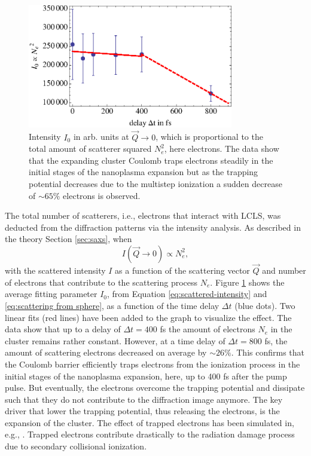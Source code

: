 \begin{figure}
	\centering
		\includegraphics[width=0.80\textwidth]{images/results/number-of-scatterer.eps}
	\caption[Time-resoved behavior of number of scatterers due to nanoplasma expansion]{Intensity $I_{0}$ in arb. units at $\vec{Q}\rightarrow 0$, which is proportional to the total amount of scatterer squared $N_{e}^{2}$, here electrons. The data show that the expanding cluster Coulomb traps electrons steadily in the initial stages of the nanoplasma expansion but as the trapping potential decreases due to the multistep ionization a sudden decrease of $\sim 65\%$ electrons is observed.}
	\label{fig:number-of-scatterer}
\end{figure}
The total number of scatterers, i.e., electrons that interact with LCLS, was deducted from the diffraction patterns via the intensity analysis. As described in the theory Section \ref{sec:saxs}, when
\begin{equation}
I\left(\vec{Q}\rightarrow 0\right)\propto N_{e}^{2},
\label{eq:}
\end{equation}
with the scattered intensity $I$ as a function of the scattering vector $\vec{Q}$ and number of electrons that contribute to the scattering process $N_{e}$. Figure \ref{fig:number-of-scatterer} shows the average fitting parameter $I_{0}$, from Equation \eqref{eq:scattered-intensity} and \eqref{eq:scattering from sphere}, as a function of the time delay $\Delta t$ (blue dots). Two linear fits (red lines) have been added to the graph to visualize the effect. The data show that up to a delay of $\Delta t=400$ fs the amount of electrons $N_{e}$ in the cluster remains rather constant. However, at a time delay of $\Delta t=800$ fs, the amount of scattering electrons decreased on average by $\sim 26 \%$. This confirms that the Coulomb barrier efficiently traps electrons from the ionization process in the initial stages of the nanoplasma expansion, here, up to 400 fs after the pump pulse. But eventually, the electrons overcome the trapping potential and dissipate such that they do not contribute to the diffraction image anymore. The key driver that lower the trapping potential, thus releasing the electrons, is the expansion of the cluster. The effect of trapped electrons has been simulated in, e.g., \citep{Hau-Riege-2004-PRE}. Trapped electrons contribute drastically to the radiation damage process due to secondary collisional ionization.\\
